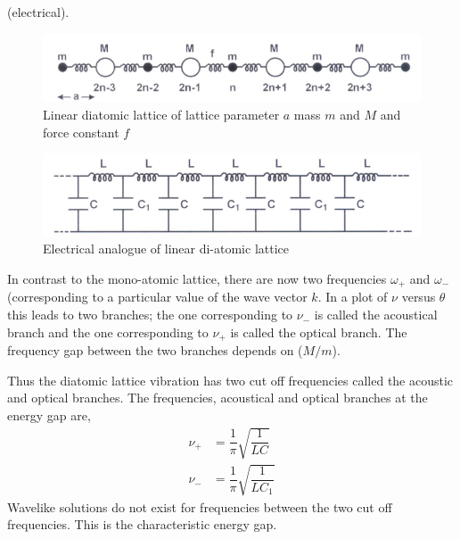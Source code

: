 \documentclass[%
 aip,
 amsmath,amssymb,
 reprint, floatfix%
]{revtex4-1}
\begin{document}
    (electrical).
    \begin{figure}
        \centering
        \includegraphics[scale = 0.6]{Figures/diatomiclattice.png}
        \caption{Linear diatomic lattice of lattice parameter $a$ mass $m$ and $M$ and force constant $f$}
        \label{fig:dilattice}
    \end{figure}
    \begin{figure}
        \centering
        \includegraphics[scale = 0.6]{Figures/diatomiclatticeanalog.png}
        \caption{Electrical analogue of linear di-atomic lattice}
        \label{fig:dianalog}
    \end{figure}
    In contrast to the mono-atomic lattice, there are now two frequencies $\omega_{+}$ and $\omega_{-}$ (corresponding to a particular value of the wave vector $k$. In a plot of $\nu$ versus $\theta$ this leads to two branches; the one corresponding to $\nu_{-}$ is called the acoustical branch and the one corresponding to $\nu_{+}$ is called the optical branch. The frequency gap between the two branches depends on ($M/m$).
    \par
    Thus the diatomic lattice vibration has two cut off frequencies called the acoustic and optical branches. The frequencies, acoustical and optical branches at the energy gap are,
    \begin{equation}
        \begin{split}
            \nu_{+} &= \dfrac{1}{\pi} \sqrt{\dfrac{1}{LC}} \\
            \nu_{-} &= \dfrac{1}{\pi} \sqrt{\dfrac{1}{LC_1}}
        \end{split}
    \end{equation}
    Wavelike solutions do not exist for frequencies between the two cut off frequencies. This is the characteristic energy gap.
\end{document}
